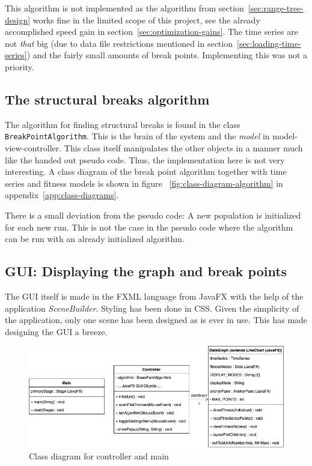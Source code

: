 This algorithm is not implemented as the algorithm from
section~\ref{sec:range-tree-design} works fine in the limited scope of this
project, see the already accomplished speed gain in
section~\ref{sec:optimization-gains}. The time series are not \textit{that} big
(due to data file restrictions mentioned in
section~\ref{sec:loading-time-series}) and the fairly small amounts of break
points. Implementing this was not a priority. 



\subsection{The structural breaks algorithm}

The algorithm for finding structural breaks is found in the class
\texttt{BreakPointAlgorithm}. This is the brain of the system and the
\textit{model} in model-view-controller. This class itself manipulates the other
objects in a manner much like the handed out pseudo code. Thus, the
implementation here is not very interesting. A class diagram of the break point
algorithm together with time series and fitness models is shown in figure
~\ref{fig:class-diagram-algorithm} in appendix~\ref{app:class-diagrams}.

There is a small deviation from the pseudo code: A new population is initialized
for each new run. This is not the case in the pseudo code where the algorithm
can be run with an already initialized algorithm. 


\subsection{GUI: Displaying the graph and break points}
\label{sec:graph-implementation}

The GUI itself is made in the FXML language from JavaFX with the help of the
application \textit{SceneBuilder}. Styling has been done in CSS. Given the simplicity of the application, only one
scene has been designed as is ever in use. This has made 
designing the GUI a breeze. 

\begin{figure}[ht]
    \centering
    \includegraphics[width=.8\textwidth]{fig/class-diagram-controller.png}
    \caption{Class diagram for controller and main}
    \label{fig:class-diagram-controller}
\end{figure}


